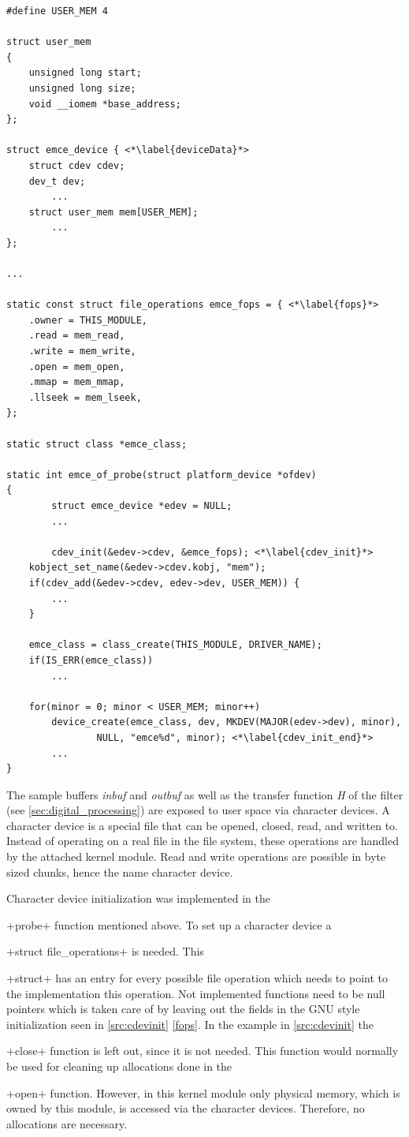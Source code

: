 \documentclass[12pt,a4paper,parskip=full,abstract=true,BCOR=12mm]{scrreprt}
\newcommand{\hack}{}
\newcommand*{\SavedLstInline}{}
\DeclareRobustCommand*{\lstinline}{%
  \ifmmode
    \let\SavedBGroup\bgroup
    \def\bgroup{%
      \let\bgroup\SavedBGroup
      \hbox\bgroup
    }%
  \fi
  \SavedLstInline
}
\def\device#1{\mbox{\textit{#1}}}
\begin{document}
\begin{lstlisting}[float=htbp,caption={Character device initialization},label=src:cdevinit,basicstyle=\hack\scriptsize]
#define USER_MEM 4

struct user_mem
{
	unsigned long start;
	unsigned long size;
	void __iomem *base_address;
};

struct emce_device { <*\label{deviceData}*>
	struct cdev cdev;
	dev_t dev;
        ...
	struct user_mem mem[USER_MEM];
        ...
};

...

static const struct file_operations emce_fops = { <*\label{fops}*>
	.owner = THIS_MODULE,
	.read = mem_read,
	.write = mem_write,
	.open = mem_open,
	.mmap = mem_mmap,
	.llseek = mem_lseek,
};

static struct class *emce_class;

static int emce_of_probe(struct platform_device *ofdev)
{
        struct emce_device *edev = NULL;
        ...

        cdev_init(&edev->cdev, &emce_fops); <*\label{cdev_init}*>
	kobject_set_name(&edev->cdev.kobj, "mem");
	if(cdev_add(&edev->cdev, edev->dev, USER_MEM)) {
		...
	}

	emce_class = class_create(THIS_MODULE, DRIVER_NAME);
	if(IS_ERR(emce_class))
		...

	for(minor = 0; minor < USER_MEM; minor++)
		device_create(emce_class, dev, MKDEV(MAJOR(edev->dev), minor),
				NULL, "emce%d", minor); <*\label{cdev_init_end}*>
        ...
}
\end{lstlisting}

The sample buffers \device{inbuf} and \device{outbuf} as well as the transfer
function \device{H} of the filter (see \cref{sec:digital_processing}) are
exposed to user space via character devices\cite{ldd}. A character device
is a special file that can be opened, closed, read, and written to. Instead of
operating on a real file in the file system, these operations are handled by
the attached kernel module. Read and write operations are possible in byte
sized chunks, hence the name character device.

Character device initialization was implemented in the \lstinline+probe+
function mentioned above. To set up a character device a
\lstinline+struct file_operations+\cite{ldd} is needed. This \lstinline+struct+
has an entry for every possible file operation which needs to point to the
implementation this operation. Not implemented functions need to be null pointers
which is taken care of by leaving out the fields
in the GNU style initialization seen in \cref{src:cdevinit} \cref{fops}. In
the example in \cref{src:cdevinit} the \lstinline+close+ function is left
out, since it is not needed. This function would normally be used for
cleaning up allocations done in the \lstinline+open+ function. However,
in this kernel module only physical memory, which is owned by this module,
is accessed via the character devices. Therefore, no allocations are necessary.
\end{document}
